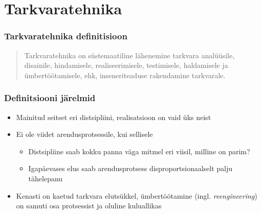 \section{Tarkvaratehnika}
\begin{frame}[fragile]
  \frametitle{Tarkvaratehnika definitisioon}
	\begin{center}
		\begin{quote}
			Tarkvaratehnika on süstemaatiline lähenemine tarkvara analüüsile, disainile, hindamisele, realiseerimisele, testimisele, haldamisele ja ümbertöötamisele, ehk, inseneriteaduse rakendamine tarkvarale.
		\end{quote}		
	\end{center}
	\cite{laplante}
\end{frame}

\begin{frame}[fragile]
  \frametitle{Definitsiooni järelmid}
	\begin{itemize}
		\item Mainitud seitset eri distsipliini, realisatsioon on vaid üks neist
		\item Ei ole viidet arendusprotsessile, kui sellisele
			\begin{itemize}
				\item Distsipliine saab kokku panna väga mitmel eri viisil, milline on parim?
				\item Igapäevases elus saab arendusprotsess disproportsionaalselt palju tähelepanu
			\end{itemize}
		\item Kenasti on kaetud tarkvara elutsükkel, ümbertöötamine (ingl. \emph{reengineering}) on samuti osa protsessist ja oluline kuluallikas
	\end{itemize}
\end{frame}

